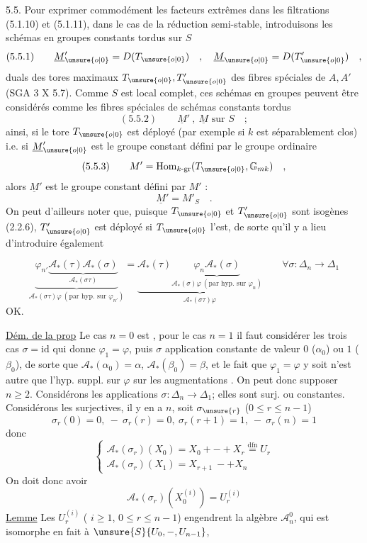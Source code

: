 5.5. Pour exprimer commodément les facteurs extrêmes dans les filtrations (5.1.10) et (5.1.11), dans le cas de la réduction semi-stable, introduisons les schémas en groupes constants tordus sur $S$
\[
(5.5.1)\qquad\underline M'_{\unsure{o|0}}=D(T_{\unsure{o|0}})\quad,\quad\underline M_{\unsure{o|0}}=D(T'_{\unsure{o|0}})\quad,
\]
duals des tores maximaux $T_{\unsure{o|0}},T'_{\unsure{o|0}}$ des fibres spéciales de $A,A'$ (SGA 3 X 5.7). Comme $S$ est local complet, ces schémas en groupes peuvent être considérés comme les fibres spéciales de schémas constants tordus
\[
(5.5.2)\qquad\underline M'\ ,\ \underline M\text{ sur }S\quad;
\]
ainsi, si le tore $T_{\unsure{o|0}}$ est déployé (par exemple si $k$ est séparablement clos) i.e. si $\underline M'_{\unsure{o|0}}$ est le groupe constant défini par le groupe ordinaire
\[
(5.5.3)\qquad M'=\operatorname{Hom}_{k\text{-gr}}(T_{\unsure{o|0}},\mathbb G_{mk})\quad,
\]
alors $\underline M'$ est le groupe constant défini par $M'$ :
\[
\underline M'=M'_S\quad.
\]
On peut d'ailleurs noter que, puisque $T_{\unsure{o|0}}$ et $T'_{\unsure{o|0}}$ sont isogènes (2.2.6), $T'_{\unsure{o|0}}$ est déployé si $T_{\unsure{o|0}}$ l'est, de sorte qu'il y a lieu d'introduire également

\[
\underbrace{\varphi_{n'}\underbrace{\mathcal A_*(\tau)\mathcal A_*(\sigma)}_{\mathcal A_*(\sigma\tau)}}_{\mathcal A_*(\sigma\tau)\varphi\ (\text{par hyp. sur }\varphi_{n'})}
=
\underbrace{\mathcal A_*(\tau)\underbrace{\varphi_n\mathcal A_*(\sigma)}_{\mathcal A_*(\sigma)\varphi\ (\text{par hyp. sur }\varphi_n)}}_{\mathcal A_*(\sigma\tau)\varphi}
\qquad\forall\sigma:\Delta_n\to\Delta_1
\]
OK.

\uline{Dém. de la prop} Le cas $n=0$ est , pour le cas $n=1$ il faut considérer les trois cas $\sigma=\mathrm{id}$ qui donne $\varphi_1=\varphi$, puis $\sigma$ application constante de valeur $0$ ($\alpha_0$) ou $1$ ($\beta_0$), de sorte que $\mathcal A_*(\alpha_0)=\alpha$, $\mathcal A_*(\beta_0)=\beta$, et le fait que $\varphi_1=\varphi$ y soit  n'est autre que l'hyp. suppl. sur $\varphi$ sur les augmentations \inserted{$\alpha,\beta$}. On peut donc supposer $n\ge2$. Considérons les applications  $\sigma:\Delta_n\to\Delta_1$; elles sont surj. ou constantes. Considérons les surjectives, il y en a $n$, soit $\sigma_{\unsure{r}}$ ($0\le r\le n-1$)
\[
\sigma_r(0)=0,\ -\ \sigma_r(r)=0,\ \sigma_r(r+1)=1,\ -\ \sigma_r(n)=1
\]
donc 
\[
\begin{cases}
\mathcal A_*(\sigma_r)(X_0)=X_0+-+X_r\overset{\mathrm{dfn}}=U_r\\
\mathcal A_*(\sigma_r)(X_1)=X_{r+1}\ -+X_n
\end{cases}
\]
On doit donc avoir
\[
\mathcal A_*(\sigma_r)(X_0^{(i)})=U_r^{(i)}
\]
\uline{Lemme} Les $U_r^{(i)}$ ( $i\ge1$, $0\le r\le n-1$) engendrent la algèbre $\mathcal A_n^0$, qui est isomorphe en fait à $\unsure{S}\{U_0,-,U_{n-1}\}$,

